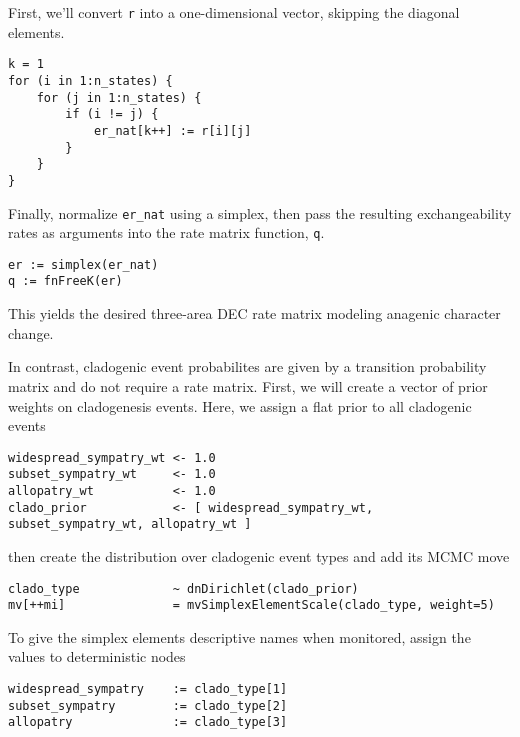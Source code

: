 First, we'll convert {\tt r} into a one-dimensional vector, skipping the diagonal elements.

\begin{snugshade}
\begin{lstlisting}
k = 1
for (i in 1:n_states) {
    for (j in 1:n_states) {
        if (i != j) {
            er_nat[k++] := r[i][j]
        }
    }
}
\end{lstlisting}
\end{snugshade}

Finally, normalize {\tt er\_nat} using a simplex, then pass the resulting exchangeability rates as arguments into the rate matrix function, {\tt q}.

\begin{snugshade}
\begin{lstlisting}
er := simplex(er_nat)
q := fnFreeK(er)
\end{lstlisting}
\end{snugshade}

This yields the desired three-area DEC rate matrix modeling anagenic character change.


In contrast, cladogenic event probabilites are given by a transition probability matrix and do not require a rate matrix.
First, we will create a vector of prior weights on cladogenesis events. Here, we assign a flat prior to all cladogenic events

\begin{snugshade}
\begin{lstlisting}
widespread_sympatry_wt <- 1.0
subset_sympatry_wt     <- 1.0
allopatry_wt           <- 1.0
clado_prior            <- [ widespread_sympatry_wt, subset_sympatry_wt, allopatry_wt ]
\end{lstlisting}
\end{snugshade}

then create the distribution over cladogenic event types and add its MCMC move

\begin{snugshade}
\begin{lstlisting}
clado_type             ~ dnDirichlet(clado_prior)
mv[++mi]               = mvSimplexElementScale(clado_type, weight=5)
\end{lstlisting}
\end{snugshade}

To give the simplex elements descriptive names when monitored, assign the values to deterministic nodes

\begin{snugshade}
\begin{lstlisting}
widespread_sympatry    := clado_type[1]
subset_sympatry        := clado_type[2]
allopatry              := clado_type[3]
\end{lstlisting}
\end{snugshade}

